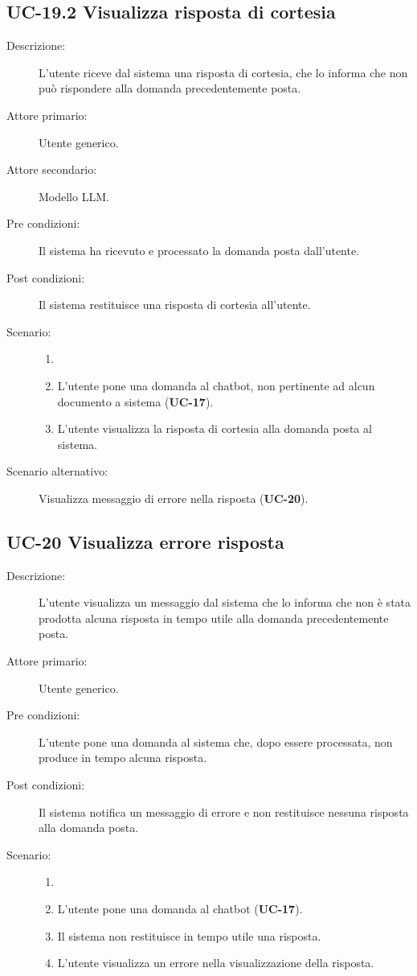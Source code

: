 \subsection{UC-19.2 Visualizza risposta di cortesia}
\begin{description}
    \item[Descrizione:] L'utente riceve dal sistema una risposta di cortesia, che lo informa che non può rispondere alla domanda precedentemente posta.
    \item[Attore primario:] Utente generico.
    \item[Attore secondario:] Modello LLM. 
    \item[Pre condizioni:] Il sistema ha ricevuto e processato la domanda posta dall'utente.
    \item[Post condizioni:] Il sistema restituisce una risposta di cortesia all'utente.
    \item[Scenario:]
    \begin{enumerate}
        \item[]
        \item L’utente pone una domanda al chatbot, non pertinente ad alcun documento a sistema (\textbf{UC-17}).
        \item L'utente visualizza la risposta di cortesia alla domanda posta al sistema.
    \end{enumerate}
    \item[Scenario alternativo:] Visualizza messaggio di errore nella risposta (\textbf{UC-20}).
\end{description}

\subsection{UC-20 Visualizza errore risposta}
\begin{description}
    \item[Descrizione:] L'utente visualizza un messaggio dal sistema che lo informa che non è stata prodotta alcuna risposta in tempo utile alla domanda precedentemente posta.
    \item[Attore primario:] Utente generico.
    \item[Pre condizioni:] L'utente pone una domanda al sistema che, dopo essere processata, non produce in tempo alcuna risposta.
    \item[Post condizioni:] Il sistema notifica un messaggio di errore e non restituisce nessuna risposta alla domanda posta.
    \item[Scenario:] 
    \begin{enumerate}
        \item[]
        \item L’utente pone una domanda al chatbot (\textbf{UC-17}).
        \item Il sistema non restituisce in tempo utile una risposta.
        \item L'utente visualizza un errore nella visualizzazione della risposta.
    \end{enumerate}
\end{description}

